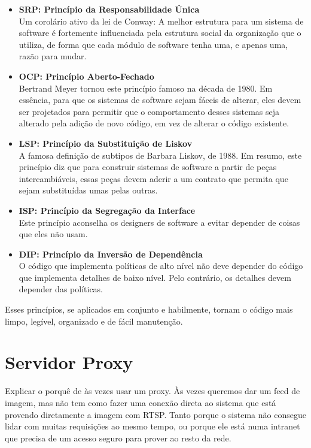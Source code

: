 \documentclass[12pt, %
openright, 
oneside, %
a4paper,    %
brazil]{facom-ufu-abntex2}
\begin{document}
\begin{itemize}
	\item \textbf{SRP: Princípio da Responsabilidade Única}\\
	      Um corolário ativo da lei de Conway: A melhor estrutura para um sistema de software é fortemente influenciada pela estrutura social da organização que o utiliza, de forma que cada módulo de software tenha uma, e apenas uma, razão para mudar.

	\item \textbf{OCP: Princípio Aberto-Fechado}\\
	      Bertrand Meyer tornou este princípio famoso na década de 1980. Em essência, para que os sistemas de software sejam fáceis de alterar, eles devem ser projetados para permitir que o comportamento desses sistemas seja alterado pela adição de novo código, em vez de alterar o código existente.

	\item \textbf{LSP: Princípio da Substituição de Liskov}\\
	      A famosa definição de subtipos de Barbara Liskov, de 1988. Em resumo, este princípio diz que para construir sistemas de software a partir de peças intercambiáveis, essas peças devem aderir a um contrato que permita que sejam substituídas umas pelas outras.

	\item \textbf{ISP: Princípio da Segregação da Interface}\\
	      Este princípio aconselha os designers de software a evitar depender de coisas que eles não usam.

	\item \textbf{DIP: Princípio da Inversão de Dependência}\\
	      O código que implementa políticas de alto nível não deve depender do código que implementa detalhes de baixo nível. Pelo contrário, os detalhes devem depender das políticas.
\end{itemize}

Esses princípios, se aplicados em conjunto e habilmente, tornam o código mais
limpo, legível, organizado e de fácil manutenção. \cite{martin2018clean3}

\section{Servidor Proxy}

Explicar o porquê de às vezes usar um proxy. Às vezes queremos dar um feed de
imagem, mas não tem como fazer uma conexão direta ao sistema que está provendo
diretamente a imagem com RTSP. Tanto porque o sistema não consegue lidar com
muitas requisições ao mesmo tempo, ou porque ele está numa intranet que precisa
de um acesso seguro para prover ao resto da rede.
\end{document}
